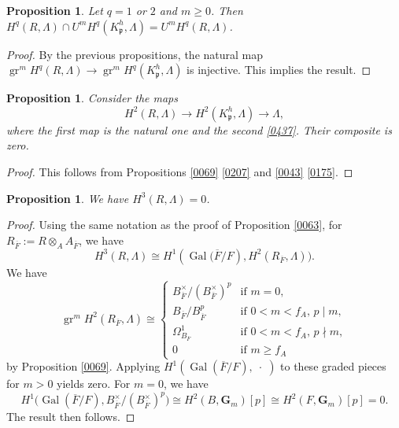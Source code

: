 \documentclass{amsart}
\newtheorem{Prop}[Thm]{Proposition}
\theoremstyle{remark}
\numberwithin{equation}{subsection}
\newcommand{\tensor}{\mathbin{\otimes}}
\newcommand{\closure}[1]{\overline{#1}}
\newcommand{\Gm}{\mathbf{G}_{m}}
\newcommand{\var}{\;\cdot\;}
\newcommand{\ideal}[1]{\mathfrak{#1}}
\DeclareMathOperator{\Gal}{Gal}
\DeclareMathOperator{\gr}{gr}
\begin{document}
\begin{Prop} \label{0071}
	Let $q = 1$ or $2$ and $m \ge 0$.
	Then $H^{q}(R, \Lambda) \cap U^{m} H^{q}(K_{\ideal{p}}^{h}, \Lambda) = U^{m} H^{q}(R, \Lambda)$.
\end{Prop}

\begin{proof}
	By the previous propositions,
	the natural map
	$\gr^{m} H^{q}(R, \Lambda) \to \gr^{m} H^{q}(K_{\ideal{p}}^{h}, \Lambda)$
	is injective.
	This implies the result.
\end{proof}

\begin{Prop} \label{0503}
	Consider the maps
		\[
				H^{2}(R, \Lambda)
			\to
				H^{2}(K_{\ideal{p}}^{h}, \Lambda)
			\to
				\Lambda,
		\]
	where the first map is the natural one and the second \eqref{0437}.
	Their composite is zero.
\end{Prop}

\begin{proof}
	This follows from Propositions \ref{0069} \eqref{0207} and \ref{0043} \eqref{0175}.
\end{proof}

\begin{Prop} \label{0072}
	We have $H^{3}(R, \Lambda) = 0$.
\end{Prop}

\begin{proof}
	Using the same notation as the proof of
	Proposition \ref{0063},
	for $R_{\closure{F}} := R \tensor_{A} A_{\closure{F}}$,
	we have
		\[
				H^{3}(R, \Lambda)
			\cong
				H^{1}(\Gal \bigl(
					\closure{F} / F),
					H^{2}(R_{\closure{F}}, \Lambda)
				\bigr).
		\]
	We have
		\[
				\gr^{m} H^{2}(R_{\closure{F}}, \Lambda)
			\cong
				\begin{cases}
						B_{\closure{F}}^{\times} / (B_{\closure{F}}^{\times})^{p}
					&	\text{if }
						m = 0,
					\\
						B_{\closure{F}} / B_{\closure{F}}^{p}
					&	\text{if }
						0 < m < f_{A},\, p \mid m,
					\\
						\Omega_{B_{\closure{F}}}^{1}
					&	\text{if }
						0 < m < f_{A},\, p \nmid m,
					\\
						0
					&	\text{if }
						m \ge f_{A}
				\end{cases}
		\]
	by Proposition \ref{0069}.
	Applying $H^{1}(\Gal(\closure{F} / F), \var)$ to these graded pieces for $m > 0$ yields zero.
	For $m = 0$, we have
		\[
				H^{1} \bigl(
					\Gal(\closure{F} / F),
					B_{\closure{F}}^{\times} / (B_{\closure{F}}^{\times})^{p}
				\bigr)
			\cong
				H^{2}(B, \Gm)[p]
			\cong
				H^{2}(F, \Gm)[p]
			=
				0.
		\]
	The result then follows.
\end{proof}
\end{document}
